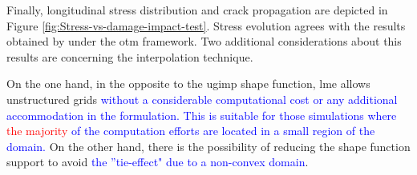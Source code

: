 \documentclass[preprint,12pt,a4paper]{elsarticle}
\begin{document}
Finally, longitudinal stress distribution and crack propagation are
depicted in Figure \ref{fig:Stress-vs-damage-impact-test}. Stress
evolution agrees with the results obtained by \cite{Navas_2017_ES}
under the \acrshort{otm} framework. Two additional considerations about
this results are concerning the interpolation technique. 

On the one hand, in the opposite to the \acrshort{ugimp} shape function, \acrshort{lme}
allows unstructured grids \textcolor{blue}{without a considerable computational cost or any additional accommodation in the formulation. This is suitable for those simulations where \textcolor{red}{the majority} of the computation efforts are located in a small region of the domain.}
On the other hand, there is the possibility of reducing the shape function support to avoid \textcolor{blue}{the ''tie-effect" due to a non-convex domain}.
\end{document}
